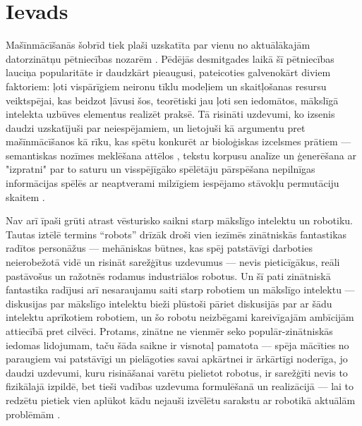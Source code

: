 \documentclass[12pt, a4paper]{article}
\numberwithin{equation}{section} %
\begin{document}

\newpage
\tableofcontents
\thispagestyle{empty}
\newpage
\setcounter{page}{3}

\section*{Ievads} %


Mašīnmācīšanās šobrīd tiek plaši uzskatīta par vienu no aktuālākajām datorzinātņu pētniecības nozarēm \cite{no_shit}. Pēdējās desmitgades laikā šī pētniecības lauciņa popularitāte ir daudzkārt pieaugusi, pateicoties galvenokārt diviem faktoriem: ļoti vispārīgiem neironu tīklu modeļiem un skaitļošanas resursu veiktspējai, kas beidzot ļāvusi šos, teorētiski jau ļoti sen \cite{mcculloch1943logical, linnainmaa1970representation, fukushima1988neocognitron} iedomātos, mākslīgā intelekta uzbūves elementus realizēt praksē. Tā risināti uzdevumi, ko izsenis daudzi uzskatījuši par neiespējamiem, un lietojuši kā argumentu pret mašīnmācīšanos kā rīku, kas spētu konkurēt ar bioloģiskas izcelsmes prātiem --- semantiskas nozīmes meklēšana attēlos \cite{krizhevsky2012imagenet}, tekstu korpusu analīze un ģenerēšana ar "izpratni" par to saturu \cite{vaswani2017attention} un visspējīgāko spēlētāju pārspēšana nepilnīgas informācijas spēlēs ar neaptverami milzīgiem iespējamo stāvokļu permutāciju skaitem \cite{silver2016mastering}.

Nav arī īpaši grūti atrast vēsturisko saikni starp mākslīgo intelektu un robotiku. Tautas iztēlē termins ``robots'' drīzāk droši vien iezīmēs zinātniskās fantastikas radītos personāžus --- mehāniskas būtnes, kas spēj patstāvīgi darboties neierobežotā vidē un risināt sarežģītus uzdevumus --- nevis pieticīgākus, reāli pastāvošus un ražotnēs rodamus industriālos robotus. Un šī pati zinātniskā fantastika radījusi arī nesaraujamu saiti starp robotiem un mākslīgo intelektu \cite{asimov2004robot} --- diskusijas par mākslīgo intelektu bieži plūstoši pāriet diskusijās par ar šādu intelektu aprīkotiem robotiem, un šo robotu neizbēgami kareivīgajām ambīcijām attiecībā pret cilvēci. Protams, zinātne ne vienmēr seko populār-zinātniskās iedomas lidojumam, taču šāda saikne ir visnotaļ pamatota --- spēja mācīties no paraugiem vai patstāvīgi un pielāgoties savai apkārtnei ir ārkārtīgi noderīga, jo daudzi uzdevumi, kuru risināšanai varētu pielietot robotus, ir sarežģīti nevis to fizikālajā izpildē, bet tieši vadības uzdevuma formulēšanā un realizācijā --- lai to redzētu pietiek vien aplūkot kādu nejauši izvēlētu sarakstu ar robotikā aktuālām problēmām \cite{popsci}.
\end{document}
